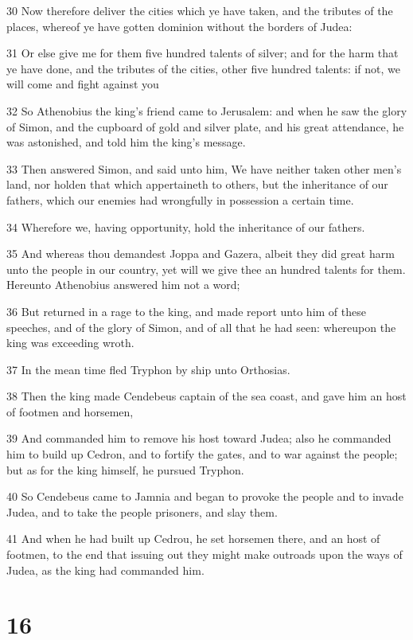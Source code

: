 \par 30 Now therefore deliver the cities which ye have taken, and the tributes of the places, whereof ye have gotten dominion without the borders of Judea:
\par 31 Or else give me for them five hundred talents of silver; and for the harm that ye have done, and the tributes of the cities, other five hundred talents: if not, we will come and fight against you
\par 32 So Athenobius the king's friend came to Jerusalem: and when he saw the glory of Simon, and the cupboard of gold and silver plate, and his great attendance, he was astonished, and told him the king's message.
\par 33 Then answered Simon, and said unto him, We have neither taken other men's land, nor holden that which appertaineth to others, but the inheritance of our fathers, which our enemies had wrongfully in possession a certain time.
\par 34 Wherefore we, having opportunity, hold the inheritance of our fathers.
\par 35 And whereas thou demandest Joppa and Gazera, albeit they did great harm unto the people in our country, yet will we give thee an hundred talents for them. Hereunto Athenobius answered him not a word;
\par 36 But returned in a rage to the king, and made report unto him of these speeches, and of the glory of Simon, and of all that he had seen: whereupon the king was exceeding wroth.
\par 37 In the mean time fled Tryphon by ship unto Orthosias.
\par 38 Then the king made Cendebeus captain of the sea coast, and gave him an host of footmen and horsemen,
\par 39 And commanded him to remove his host toward Judea; also he commanded him to build up Cedron, and to fortify the gates, and to war against the people; but as for the king himself, he pursued Tryphon.
\par 40 So Cendebeus came to Jamnia and began to provoke the people and to invade Judea, and to take the people prisoners, and slay them.
\par 41 And when he had built up Cedrou, he set horsemen there, and an host of footmen, to the end that issuing out they might make outroads upon the ways of Judea, as the king had commanded him.

\chapter{16}

